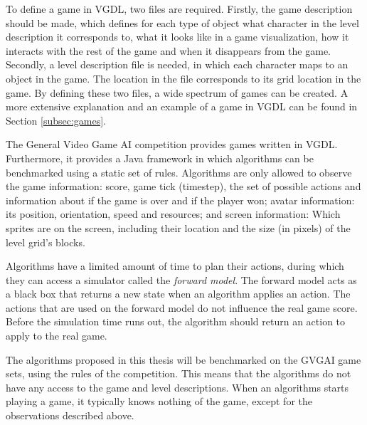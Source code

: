 To define a game in VGDL, two files are required. Firstly, the game description
should be made, which defines for each type of object what character in the
level description it corresponds to, what it looks like in a game visualization,
how it interacts with the rest of the game and when it disappears from the
game. Secondly, a level description file is needed, in which each character maps
to an object in the game. The location in the file corresponds to its grid
location in the game. By defining these two files, a wide spectrum of games
can be created. A more extensive explanation and an example of a game in VGDL
can be found in Section \ref{subsec:games}.

The General Video Game AI competition provides games written in VGDL.
Furthermore, it provides a Java framework in which algorithms can be
benchmarked using a static set of rules. Algorithms are only allowed to observe
the game information: score, game tick (timestep), the set of possible actions
and information about if the game is over and if the player won; avatar
information: its position, orientation, speed and resources; and screen
information: Which sprites are on the screen, including their location and the
size (in pixels) of the level grid's blocks.

Algorithms have a limited amount of time to plan their actions, during which
they can access a simulator called the \emph{forward model}. The forward model
acts as a black box that returns a new state when an algorithm applies an
action. The actions that are used on the forward model do not influence the real
game score. Before the simulation time runs out, the algorithm should return an
action to apply to the real game.

The algorithms proposed in this thesis will be benchmarked on the GVGAI game
sets, using the rules of the competition. This means that the algorithms do not
have any access to the game and level descriptions. When an algorithms starts
playing a game, it typically knows nothing of the game, except for the
observations described above.
